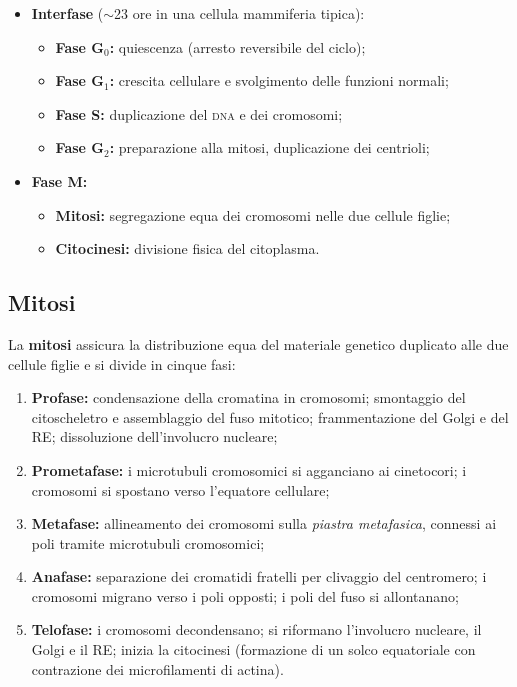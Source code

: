 \documentclass[11pt,a4paper,openright,twoside]{book}
\theoremstyle{definition}
\theoremstyle{plain}
\theoremstyle{remark}
\newcommand{\dna}{\textsc{dna}}
\begin{document}
\begin{itemize}
  \item \textbf{Interfase} ($\sim$23 ore in una cellula mammiferia tipica):
    \begin{itemize}
      \item \textbf{Fase G$_0$:} quiescenza (arresto reversibile del ciclo);
      \item \textbf{Fase G$_1$:} crescita cellulare e svolgimento delle funzioni normali;
      \item \textbf{Fase S:} duplicazione del \dna{} e dei cromosomi;
      \item \textbf{Fase G$_2$:} preparazione alla mitosi, duplicazione dei centrioli;
    \end{itemize}
  \item \textbf{Fase M:}
    \begin{itemize}
      \item \textbf{Mitosi:} segregazione equa dei cromosomi nelle due cellule figlie;
      \item \textbf{Citocinesi:} divisione fisica del citoplasma.
    \end{itemize}
\end{itemize}

\subsection{Mitosi}

La \textbf{mitosi} assicura la distribuzione equa del materiale genetico duplicato alle due cellule figlie e si divide in cinque fasi:

\begin{enumerate}
  \item \textbf{Profase:} condensazione della cromatina in cromosomi; smontaggio del citoscheletro e assemblaggio del fuso mitotico; frammentazione del Golgi e del RE; dissoluzione dell'involucro nucleare;
  \item \textbf{Prometafase:} i microtubuli cromosomici si agganciano ai cinetocori; i cromosomi si spostano verso l'equatore cellulare;
  \item \textbf{Metafase:} allineamento dei cromosomi sulla \textit{piastra metafasica}, connessi ai poli tramite microtubuli cromosomici;
  \item \textbf{Anafase:} separazione dei cromatidi fratelli per clivaggio del centromero; i cromosomi migrano verso i poli opposti; i poli del fuso si allontanano;
  \item \textbf{Telofase:} i cromosomi decondensano; si riformano l'involucro nucleare, il Golgi e il RE; inizia la citocinesi (formazione di un solco equatoriale con contrazione dei microfilamenti di actina).
\end{enumerate}
\end{document}
